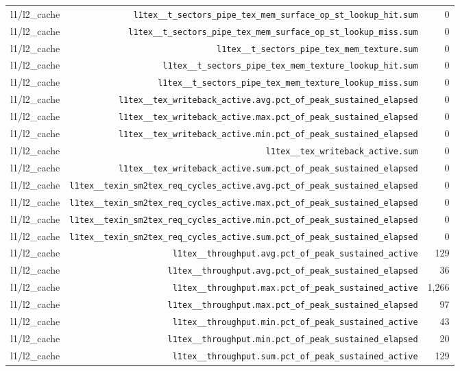 \begin{table}[h]
\begin{tabular}{|l|r|r|}
l1/l2_cache & \texttt{l1tex__t_sectors_pipe_tex_mem_surface_op_st_lookup_hit.sum} & 0 \\
l1/l2_cache & \texttt{l1tex__t_sectors_pipe_tex_mem_surface_op_st_lookup_miss.sum} & 0 \\
l1/l2_cache & \texttt{l1tex__t_sectors_pipe_tex_mem_texture.sum} & 0 \\
l1/l2_cache & \texttt{l1tex__t_sectors_pipe_tex_mem_texture_lookup_hit.sum} & 0 \\
l1/l2_cache & \texttt{l1tex__t_sectors_pipe_tex_mem_texture_lookup_miss.sum} & 0 \\
l1/l2_cache & \texttt{l1tex__tex_writeback_active.avg.pct_of_peak_sustained_elapsed} & 0 \\
l1/l2_cache & \texttt{l1tex__tex_writeback_active.max.pct_of_peak_sustained_elapsed} & 0 \\
l1/l2_cache & \texttt{l1tex__tex_writeback_active.min.pct_of_peak_sustained_elapsed} & 0 \\
l1/l2_cache & \texttt{l1tex__tex_writeback_active.sum} & 0 \\
l1/l2_cache & \texttt{l1tex__tex_writeback_active.sum.pct_of_peak_sustained_elapsed} & 0 \\
l1/l2_cache & \texttt{l1tex__texin_sm2tex_req_cycles_active.avg.pct_of_peak_sustained_elapsed} & 0 \\
l1/l2_cache & \texttt{l1tex__texin_sm2tex_req_cycles_active.max.pct_of_peak_sustained_elapsed} & 0 \\
l1/l2_cache & \texttt{l1tex__texin_sm2tex_req_cycles_active.min.pct_of_peak_sustained_elapsed} & 0 \\
l1/l2_cache & \texttt{l1tex__texin_sm2tex_req_cycles_active.sum.pct_of_peak_sustained_elapsed} & 0 \\
l1/l2_cache & \texttt{l1tex__throughput.avg.pct_of_peak_sustained_active} & 129 \\
l1/l2_cache & \texttt{l1tex__throughput.avg.pct_of_peak_sustained_elapsed} & 36 \\
l1/l2_cache & \texttt{l1tex__throughput.max.pct_of_peak_sustained_active} & 1,266 \\
l1/l2_cache & \texttt{l1tex__throughput.max.pct_of_peak_sustained_elapsed} & 97 \\
l1/l2_cache & \texttt{l1tex__throughput.min.pct_of_peak_sustained_active} & 43 \\
l1/l2_cache & \texttt{l1tex__throughput.min.pct_of_peak_sustained_elapsed} & 20 \\
l1/l2_cache & \texttt{l1tex__throughput.sum.pct_of_peak_sustained_active} & 129 \\

\end{tabular}
\end{table}

